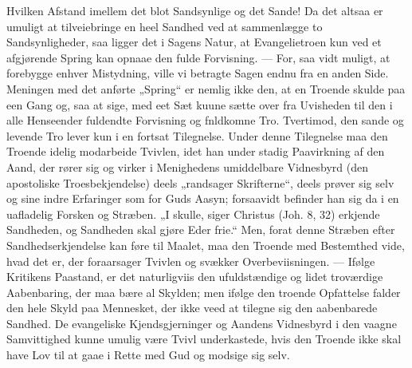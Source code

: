 \documentclass[12pt,a4paper]{book}
\begin{document}
Hvilken Afstand imellem det blot Sandsynlige og det Sande!
Da det altsaa er umuligt at tilveiebringe en heel Sandhed ved at sammenlægge to
Sandsynligheder, saa ligger det i Sagens Natur, at Evangelietroen kun ved et
afgjørende Spring kan opnaae den fulde Forvisning. --- For, saa vidt muligt, at
forebygge enhver Mistydning, ville vi betragte Sagen endnu fra en anden Side.
Meningen med det anførte „Spring“ er nemlig ikke den, at en Troende skulde paa een
Gang og, saa at sige, med eet Sæt kuune sætte over fra Uvisheden til den i alle
Henseender fuldendte Forvisning og fnldkomne Tro. Tvertimod, den sande og levende Tro
lever kun i en fortsat Tilegnelse. Under denne Tilegnelse maa den Troende idelig
modarbeide Tvivlen, idet han under stadig Paavirkning af den Aand, der rører sig og
virker i Menighedens umiddelbare Vidnesbyrd (den apostoliske Troesbekjendelse) deels
„randsager Skrifterne“, deels prøver sig selv og sine indre Erfaringer som for Guds
Aasyn; forsaavidt befinder han sig da i en uafladelig Forsken og Stræben. „I skulle,
siger Christus (Joh. 8, 32) erkjende Sandheden, og Sandheden skal gjøre Eder frie.“
Men, forat denne Stræben efter Sandhedserkjendelse kan føre til Maalet, maa den
Troende med Bestemthed vide, hvad det er, der foraarsager Tvivlen og svækker
Overbeviisningen. --- Ifølge Kritikens Paastand, er det naturligviis den
ufuldstændige og lidet troværdige Aabenbaring, der maa bære al Skylden; men ifølge
den troende Opfattelse falder den hele Skyld paa Mennesket, der ikke veed at tilegne
sig den aabenbarede Sandhed. De evangeliske Kjendsgjerninger og Aandens Vidnesbyrd i
den vaagne Samvittighed kunne umulig være Tvivl underkastede, hvis den Troende ikke
skal have Lov til at gaae i Rette med Gud og modsige sig selv.
\end{document}

